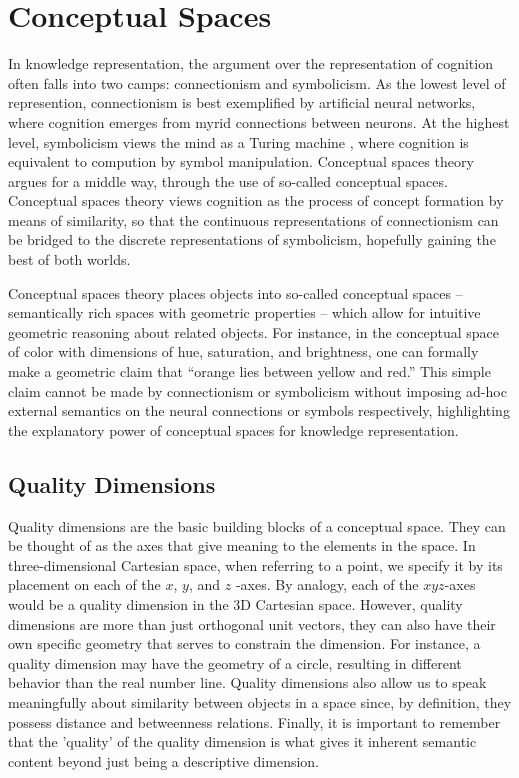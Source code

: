 \section{Conceptual Spaces}
\label{section:conceptual-spaces}

In knowledge representation, the argument over the representation of cognition often falls into two camps: connectionism and symbolicism.  As the lowest level of represention, connectionism is best exemplified by artificial neural networks, where cognition emerges from myrid connections between neurons.  At the highest level, symbolicism views the mind as a Turing machine \cite{turing2009computing}, where cognition is equivalent to compution by symbol manipulation.  Conceptual spaces theory \cite{gardenfors2004conceptual} argues for a middle way, through the use of so-called conceptual spaces.  Conceptual spaces theory views cognition as the process of concept formation by means of similarity, so that the continuous representations of connectionism can be bridged to the discrete representations of symbolicism, hopefully gaining the best of both worlds.  

Conceptual spaces theory places objects into so-called conceptual spaces -- semantically rich spaces with geometric properties -- which allow for intuitive geometric reasoning about related objects. For instance, in the conceptual space of color with dimensions of hue, saturation, and brightness, one can formally make a geometric claim that “orange lies between yellow and red.”  This simple claim cannot be made by connectionism or symbolicism without imposing ad-hoc external semantics on the neural connections or symbols respectively, highlighting the explanatory power of conceptual spaces for knowledge representation.

\subsection{Quality Dimensions}
\label{subsection:quality-dimensions}

Quality dimensions are the basic building blocks of a conceptual space.  They can be thought of as the axes that give meaning to the elements in the space.  In three-dimensional Cartesian space, when referring to a point, we specify it by its placement on each of the $x$, $y$, and $z$ -axes.  By analogy, each of the $xyz$-axes would be a quality dimension in the 3D Cartesian space.  However, quality dimensions are more than just orthogonal unit vectors, they can also have their own specific geometry that serves to constrain the dimension. For instance, a quality dimension may have the geometry of a circle, resulting in different behavior than the real number line.  Quality dimensions also allow us to speak meaningfully about similarity between objects in a space since, by definition, they possess distance and betweenness relations.  Finally, it is important to remember that the 'quality' of the quality dimension is what gives it inherent semantic content beyond just being a descriptive dimension.

